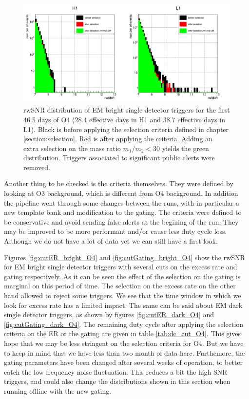 %
\begin{figure}
  \centering
  \includegraphics[width=\linewidth]{sectionO4/cRwSnr_bright.png}
  \caption{rwSNR distribution of EM bright single detector triggers for the first 46.5 days of O4 (28.4 effective days in H1 and 38.7 effective days in L1). Black is before applying the selection criteria defined in chapter \ref{section:selection}. Red is after applying the criteria. Adding an extra selection on the mass ratio $m_1/m_2<30$ yields the green distribution. Triggers associated to significant public alerts were removed.}
  \label{fig:embright_O4}
\end{figure}
%


Another thing to be checked is the criteria themselves.
They were defined by looking at O3 background, which is different from O4 background.
In addition the pipeline went through some changes between the runs, with in particular a new template bank and modification to the gating.
The criteria were defined to be conservative and avoid sending false alerts at the begining of the run.
They may be improved to be more performant and/or cause less duty cycle loss.
Although we do not have a lot of data yet we can still have a first look.

Figures \ref{fig:cutER_bright_O4} and \ref{fig:cutGating_bright_O4} show the rwSNR for EM bright single detector triggers with several cuts on the excess rate and gating respectively.
As it can be seen the effect of the selection on the gating is marginal on this period of time.
The selection on the excess rate on the other hand allowed to reject some triggers.
We see that the time window in which we look for excess rate has a limited impact.
The same can be said about EM dark single detector triggers, as shown by figures \ref{fig:cutER_dark_O4} and \ref{fig:cutGating_dark_O4}.
The remaining duty cycle after applying the selection criteria on the ER or the gating are given in table \ref{tab:dc_cut_O4}.
This gives hope that we may be less stringent on the selection criteria for O4.
But we have to keep in mind that we have less than two month of data here.
Furthemore, the gating parameters have been changed after several weeks of operation, to better catch the low frequency noise fluctuation.
This reduces a bit the high SNR triggers, and could also change the distributions shown in this section when running offline with the new gating.



